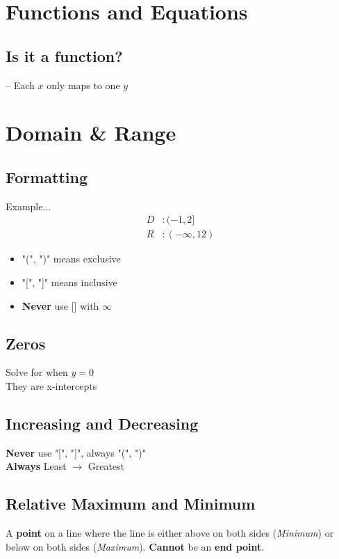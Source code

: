 \documentclass[twocolumn]{article}
\newcommand{\bd}{\textbf}
\begin{document}
    \section{Functions and Equations}
    
    \subsection{Is it a function?}
   	-- Each $x$ only maps to one $y$
   	
   	\section{Domain \& Range}
   	
   	\subsection{Formatting}
   	Example...
   	\begin{align*}
   		D&: (-1,2] \\
   		R&: (-\infty, 12)
   	\end{align*}
   \begin{itemize}[label=--]
   	\item "(", ")" means exclusive
   	\item "[", "]" means inclusive
   	\item \bd{Never} use [] with $\infty$
   \end{itemize}
   	
   	\subsection{Zeros}
   	Solve for when $y = 0$ \\
   	They are x-intercepts
   	
   	\subsection{Increasing and Decreasing}
   	\par \bd{Never} use "[", "]", always "(", ")" \\
   	\bd{Always} Least $\to$ Greatest \\
   	
   	
   	\subsection{Relative Maximum and Minimum}
   	A \bd{point} on a line where the line is either above on both sides (\emph{Minimum}) or below on both sides (\emph{Maximum}). \bd{Cannot} be an \bd{end point}.
   	
\end{document}
